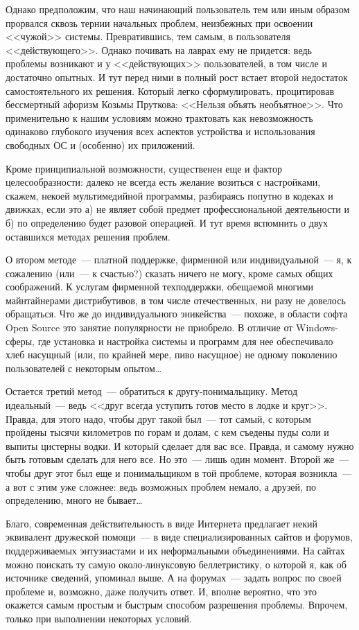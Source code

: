 Однако предположим, что наш начинающий пользователь тем или иным образом прорвался сквозь тернии начальных проблем, неизбежных при освоении <<чужой>> системы. Превратившись, тем самым, в пользователя <<действующего>>. Однако почивать на лаврах ему не придется: ведь проблемы возникают и у <<действующих>> пользователей, в том числе и достаточно опытных. И тут перед ними в полный рост встает второй недостаток самостоятельного их решения. Который легко сформулировать, процитировав бессмертный афоризм Козьмы Пруткова: <<Нельзя объять необъятное>>. Что применительно к нашим условиям можно трактовать как невозможность одинаково глубокого изучения всех аспектов устройства и использования свободных ОС и (особенно) их приложений.

Кроме принципиальной возможности, существенен еще и фактор целесообразности: далеко не всегда есть желание возиться с настройками, скажем, некоей мультимедийной программы, разбираясь попутно в кодеках и движках, если это а) не являет собой предмет профессиональной деятельности и б) по определению будет разовой операцией. И тут время вспомнить о двух оставшихся методах решения проблем.

О втором методе~--- платной поддержке, фирменной или индивидуальной~--- я, к сожалению (или~--- к счастью?) сказать ничего не могу, кроме самых общих соображений. К услугам фирменной техподдержки, обещаемой многими майнтайнерами дистрибутивов, в том числе отечественных, ни разу не довелось обращаться. Что же до индивидуального эникейства~--- похоже, в области софта Open Source это занятие популярности не приобрело. В отличие от Windows-сферы, где установка и настройка системы и программ для нее обеспечивало хлеб насущный (или, по крайней мере, пиво насущное) не одному поколению пользователей с некоторым опытом\dots

Остается третий метод~--- обратиться к другу-понимальщику. Метод идеальный~--- ведь <<друг всегда уступить готов место в лодке и круг>>. Правда, для этого надо, чтобы друг такой был~--- тот самый, с которым пройдены тысячи километров по горам и долам, с кем съедены пуды соли и выпиты цистерны водки. И который сделает для вас все. Правда, и самому нужно быть готовым сделать для него все. Но это~--- лишь один момент. Второй же~--- чтобы друг этот был еще и понимальщиком в той проблеме, которая возникла~--- а вот с этим уже сложнее: ведь возможных проблем немало, а друзей, по определению, много не бывает\dots

Благо, современная действительность в виде Интернета предлагает некий эквивалент дружеской помощи~--- в виде специализированных сайтов и форумов, поддерживаемых энтузиастами и их неформальными объединениями. На сайтах можно поискать ту самую около-линуксовую беллетристику, о которой я, как об источнике сведений, упоминал выше. А на форумах~--- задать вопрос по своей проблеме и, возможно, даже получить ответ. И, вполне вероятно, что это окажется самым простым и быстрым способом разрешения проблемы. Впрочем, только при выполнении некоторых условий.

